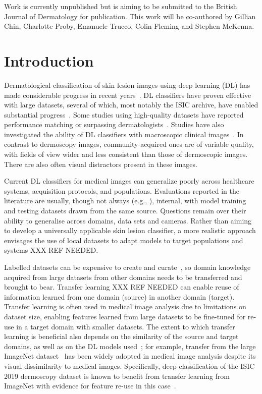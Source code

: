Work is currently unpublished but is aiming to be submitted to the British Journal of Dermatology for publication. This work will be co-authored by Gillian Chin, Charlotte Proby, Emanuele Trucco, Colin Fleming and Stephen McKenna.



\section{Introduction}
\label{sec:generalisation_intro}
Dermatological classification of skin lesion images using deep learning (DL) has made considerable progress in recent years~\citep{du2020ai,wu2022skin}. DL classifiers have proven effective with large datasets, several of which, most notably the ISIC archive, have enabled substantial progress~\citep{tschandl2018ham10000,wen2021characteristics}. Some studies using high-quality datasets have reported performance matching or surpassing dermatologists~\citep{esteva2017dermatologist,haenssle2018man,han2018classification,tschandl2019expert}. Studies have also investigated the ability of DL classifiers with macroscopic clinical images~\citep{fujisawa2019deep}. In contrast to dermoscopy images, community-acquired ones are of variable quality, with fields of view wider and less consistent than those of dermoscopic images. There are also often visual distractors present in these images.

Current DL classifiers for medical images can generalize poorly across healthcare systems, acquisition protocols, and populations. Evaluations reported in the literature are usually, though not always (e.g., \cite{han2018classification}), internal, with model training and testing datasets drawn from the same source. Questions remain over their ability to generalise across domains, data sets and cameras. Rather than aiming to develop a universally applicable skin lesion classifier, a more realistic approach envisages the use of local datasets to adapt models to target populations and systems XXX REF NEEDED. 

Labelled datasets can be expensive to create and curate~\citep{chin2022prepare}, so domain knowledge acquired from large datasets from other domains needs to be transferred and brought to bear. Transfer learning XXX REF NEEDED can enable reuse of information learned from one domain (source) in another domain (target). Transfer learning is often used in medical image analysis due to limitations on dataset size, enabling features learned from large datasets to be fine-tuned for re-use in a target domain with smaller datasets. The extent to which transfer learning is beneficial also depends on the similarity of the source and target domains, as well as on the DL models used~\citep{matsoukas2022makes}; for example, transfer from the large ImageNet dataset~\citep{deng2009imagenet} has been widely adopted in medical image analysis despite its visual dissimilarity to medical images. Specifically, deep classification of the ISIC 2019 dermoscopy dataset is known to benefit from transfer learning from ImageNet with evidence for feature re-use in this case~\citep{matsoukas2022makes}. 

